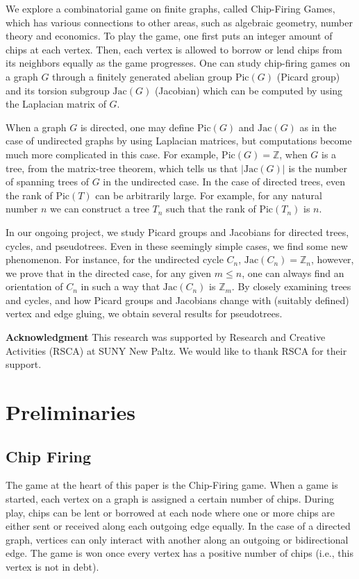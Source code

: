 \documentclass[11pt,reqno]{amsart}
\theoremstyle{definition}
\theoremstyle{plain}
\begin{document}
		We explore a combinatorial game on finite graphs, called Chip-Firing Games,
	which has various connections to other areas, such as algebraic geometry, number theory and economics.
	To play the game, one first puts an integer amount of chips at each vertex. Then,
	each vertex is allowed to borrow or lend chips from its neighbors equally as the game progresses.
	One can study chip-firing games on a graph $G$ through a finitely generated abelian group
	$\textrm{Pic}(G)$ (Picard group) and its torsion subgroup $\textrm{Jac}(G)$ (Jacobian) which can
	be computed by using the Laplacian matrix of $G$.

	When a graph $G$ is directed, one may define $\textrm{Pic}(G)$ and $\textrm{Jac}(G)$ as in the case of undirected
	graphs by using Laplacian matrices, but computations become much more complicated in this case. For example,
	$\textrm{Pic}(G)=\mathbb{Z}$, when $G$ is a tree, from the matrix-tree theorem, which tells us that $|\textrm{Jac}(G)|$ is
	the number of spanning trees of $G$ in the undirected case.
	In the case of directed trees, even the rank of $\textrm{Pic}(T)$ can be arbitrarily large.
	For example, for any natural number $n$ we can construct a tree $T_n$ such that the rank of $\textrm{Pic}(T_n)$ is $n$.

	In our ongoing project, we study Picard groups and Jacobians for directed trees, cycles, and pseudotrees.
	Even in these seemingly simple cases, we find some new phenomenon. For instance, for the undirected cycle $C_n$,
	$\textrm{Jac}(C_n)=\mathbb{Z}_n$, however, we prove that in the directed case, for any given $m \leq n$, one can
	always find an orientation of $C_n$ in such a way that $\textrm{Jac}(C_n)$ is $\mathbb{Z}_m$.
	By closely examining trees and cycles, and how Picard groups and Jacobians change with (suitably defined)
	vertex and edge gluing, we obtain several results for pseudotrees.

\bigskip


\textbf{Acknowledgment}\hspace{0.1cm} This research was supported by Research and Creative Activities (RSCA) at SUNY New Paltz. We would like to thank RSCA for their support.

\section{Preliminaries}

	\subsection{Chip Firing}
		The game at the heart of this paper is the Chip-Firing game. When a game is started, each vertex on
		a graph is assigned a certain number of chips.  During play, chips can be lent or borrowed at each
		node where one or more chips are either sent or received along each outgoing edge equally.  In the
		case of a directed graph, vertices can only interact with another along an outgoing or
		bidirectional edge.  The game is won once every vertex has a positive number of chips (i.e., this
		vertex is not in debt).
\end{document}
